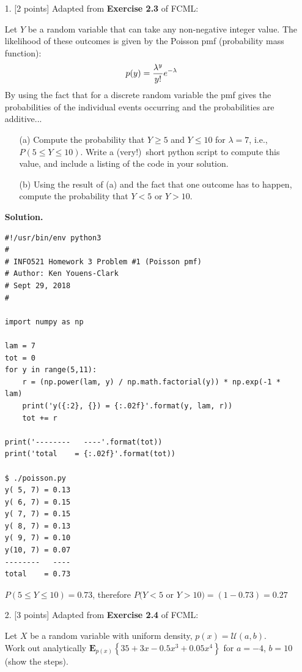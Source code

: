 \documentclass[10pt]{article}
\begin{document}
\newpage
\begin{itemize}

\item[1.] [2 points]
Adapted from {\bf Exercise 2.3} of FCML:

Let $Y$ be a random variable that can take any non-negative integer value.  The likelihood of these outcomes is given by the Poisson pmf (probability mass function):
\begin{eqnarray}
p(y) = {\lambda^y\over y!} e^{-\lambda}
\end{eqnarray}
By using the fact that for a discrete random variable the pmf gives the probabilities of the individual events occurring and the probabilities are additive...
\begin{enumerate}
\item[(a)] Compute the probability that $Y \geq 5$ and $Y \leq 10$ for $\lambda = 7$, i.e., $P(5 \leq Y \leq 10)$.  Write a (very!)~short python script to compute this value, and include a listing of the code in your solution.
\item[(b)] Using the result of (a) and the fact that one outcome has to happen, compute the probability that $Y < 5$ or $Y > 10$.
\end{enumerate}

{\bf Solution.} %

\begin{verbatim}
#!/usr/bin/env python3
#
# INFO521 Homework 3 Problem #1 (Poisson pmf)
# Author: Ken Youens-Clark
# Sept 29, 2018
#

import numpy as np

lam = 7
tot = 0
for y in range(5,11):
    r = (np.power(lam, y) / np.math.factorial(y)) * np.exp(-1 * lam)
    print('y({:2}, {}) = {:.02f}'.format(y, lam, r))
    tot += r

print('--------   ----'.format(tot))
print('total    = {:.02f}'.format(tot))

$ ./poisson.py
y( 5, 7) = 0.13
y( 6, 7) = 0.15
y( 7, 7) = 0.15
y( 8, 7) = 0.13
y( 9, 7) = 0.10
y(10, 7) = 0.07
--------   ----
total    = 0.73
\end{verbatim}

$P(5 \leq Y \leq 10) = 0.73$, therefore $P(Y < 5$ or $Y > 10) = (1 - 0.73) = 0.27$

\item[2.] [3 points]
Adapted from {\bf Exercise 2.4} of FCML:

Let $X$ be a random variable with uniform density, $p(x) = \mathcal{U}(a,b)$.  \\
Work out analytically $\mathbf{E}_{p(x)} \left\{ 35 + 3x - 0.5x^3 + 0.05x^4 \right\}$ for $a=-4$, $b=10$ (show the steps).  


\end{itemize}
\end{document}
